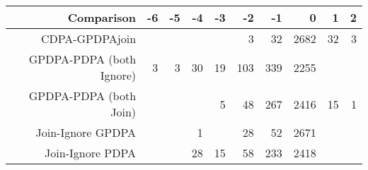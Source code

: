 \begin{tabular}{rrrrrrrrrr}
  \hline
Comparison & -6 & -5 & -4 & -3 & -2 & -1 & 0 & 1 & 2 \\ 
  \hline
CDPA-GPDPAjoin
 &  &  &  &  & 3 & 32 & 2682 & 32 & 3 \\ 
  GPDPA-PDPA
(both Ignore) & 3 & 3 & 30 & 19 & 103 & 339 & 2255 &  &  \\ 
  GPDPA-PDPA
(both Join) &  &  &  & 5 & 48 & 267 & 2416 & 15 & 1 \\ 
  Join-Ignore
GPDPA &  &  & 1 &  & 28 & 52 & 2671 &  &  \\ 
  Join-Ignore
PDPA &  &  & 28 & 15 & 58 & 233 & 2418 &  &  \\ 
   \hline
\end{tabular}

